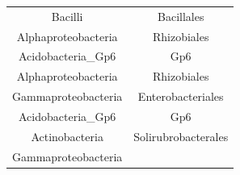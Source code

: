 \documentclass[]{article}
\begin{document}
\begin{longtable}[]{@{}cc@{}}
\begin{minipage}[t]{0.31\columnwidth}\centering\strut
Bacilli\strut
\end{minipage} & \begin{minipage}[t]{0.43\columnwidth}\centering\strut
Bacillales\strut
\end{minipage}\tabularnewline
\begin{minipage}[t]{0.31\columnwidth}\centering\strut
Alphaproteobacteria\strut
\end{minipage} & \begin{minipage}[t]{0.43\columnwidth}\centering\strut
Rhizobiales\strut
\end{minipage}\tabularnewline
\begin{minipage}[t]{0.31\columnwidth}\centering\strut
Acidobacteria\_Gp6\strut
\end{minipage} & \begin{minipage}[t]{0.43\columnwidth}\centering\strut
Gp6\strut
\end{minipage}\tabularnewline
\begin{minipage}[t]{0.31\columnwidth}\centering\strut
Alphaproteobacteria\strut
\end{minipage} & \begin{minipage}[t]{0.43\columnwidth}\centering\strut
Rhizobiales\strut
\end{minipage}\tabularnewline
\begin{minipage}[t]{0.31\columnwidth}\centering\strut
Gammaproteobacteria\strut
\end{minipage} & \begin{minipage}[t]{0.43\columnwidth}\centering\strut
Enterobacteriales\strut
\end{minipage}\tabularnewline
\begin{minipage}[t]{0.31\columnwidth}\centering\strut
Acidobacteria\_Gp6\strut
\end{minipage} & \begin{minipage}[t]{0.43\columnwidth}\centering\strut
Gp6\strut
\end{minipage}\tabularnewline
\begin{minipage}[t]{0.31\columnwidth}\centering\strut
Actinobacteria\strut
\end{minipage} & \begin{minipage}[t]{0.43\columnwidth}\centering\strut
Solirubrobacterales\strut
\end{minipage}\tabularnewline
\begin{minipage}[t]{0.31\columnwidth}\centering\strut
Gammaproteobacteria\strut

\end{minipage}
\end{longtable}
\end{document}

